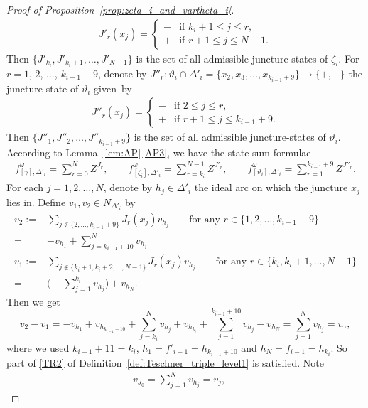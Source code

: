 \documentclass[10pt,a4paper]{amsart}
\numberwithin{equation}{section}
\theoremstyle{definition}
\begin{document}
\begin{proof}[Proof of Proposition~\ref{prop:zeta_i_and_vartheta_i}]
\begin{align*}
J'_r(x_j) = \begin{cases}
- & \mbox{if $k_i +1 \le j \le r$}, \\
+ & \mbox{if $r+1 \le j \le N-1$}.
\end{cases}
\end{align*}
Then $\{J'_{k_i}, J'_{k_i+1},\dots,J'_{N-1}\}$ is the set of all admissible juncture-states of $\zeta_i$. For $r=1$, $2$, $\dots$, $k_{i-1}+9$, denote by $J''_r \colon \vartheta_i \cap \Delta'_i = \{x_2,x_3,\dots,x_{k_{i-1}+9}\} \to \{+,-\}$ the juncture-state of $\vartheta_i$ given~by
\begin{align*}
J''_r(x_j) = \begin{cases}
- & \mbox{if $2 \le j \le r$}, \\
+ & \mbox{if $r+1 \le j \le k_{i-1}+9$}.
\end{cases}
\end{align*}
Then $\{J''_1,J''_2,\dots,J''_{k_{i-1}+9}\}$ is the set of all admissible juncture-states of $\vartheta_i$. According to Lem\-ma~\ref{lem:AP}\,\ref{AP3}, we have the state-sum formulae
\begin{align*}
f^\omega_{[\gamma],\Delta'_i} = \sum_{r=0}^{N} Z^{J_r}, \qquad
f^\omega_{[\zeta_i],\Delta'_i} = \sum_{r=k_i}^{N-1} Z^{J'_r}, \qquad
f^\omega_{[\vartheta_i],\Delta'_i} = \sum_{r=1}^{k_{i-1}+9} Z^{J''_r}.
\end{align*}
For each $j=1,2,\dots,N$, denote by $h_j \in \Delta'_i$ the ideal arc on which the juncture $x_j$ lies in. Define $v_1,v_2 \in N_{\Delta'_i}$ by
\begin{align*}
v_2 :={}& \sum_{j \notin \{2,\dots,k_{i-1}+9\}} J_r(x_j) v_{h_j} \qquad \mbox{for any $r\in\{1,2,\dots,k_{i-1}+9\}$} \\
={}& -v_{h_1} + \sum_{j=k_{i-1}+10}^{N} v_{h_j} \\
v_1 :={}& \sum_{j \notin \{k_i+1,k_i+2,\dots,N-1\}} J_r(x_j) v_{h_j} \qquad \mbox{for any $r\in \{k_i,k_i+1,\dots,N-1\}$} \\
={} & \biggl( - \sum_{j=1}^{k_i} v_{h_j} \biggr) + v_{h_N}.
\end{align*}
Then we get
\[
v_2 - v_1 = -v_{h_1} + v_{h_{k_{i-1}+10}} + \sum_{j=k_i}^{N} v_{h_j} + v_{h_{k_i}} + \sum_{j=1}^{k_{i-1}+10} v_{h_j} -v_{h_N}
= \sum_{j=1}^{N} v_{h_j} = v_\gamma,
\]
where we used $k_{i-1}+11= k_i$, $h_1 = f'_{i-1}=h_{k_{i-1}+10}$ and $h_N = f_{i-1} = h_{k_i}$. So part of \ref{TR2} of Definition~\ref{def:Teschner_triple_level1} is satisfied. Note
\begin{align*}
&v_{J_0} = \sum_{j=1}^{N} v_{h_j} = v_j, \qquad

\end{align*}
\end{proof}
\end{document}
